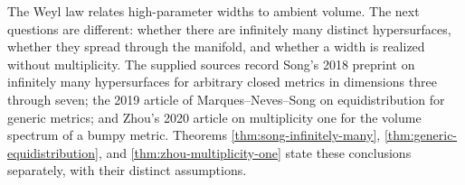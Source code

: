 \begin{remark}\label{hist:volume-spectrum}
The Weyl law \cite{LMN} relates high-parameter widths to ambient volume. The next questions are different: whether there are infinitely many distinct hypersurfaces, whether they spread through the manifold, and whether a width is realized without multiplicity. The supplied sources record Song's 2018 preprint \cite{Song18} on infinitely many hypersurfaces for arbitrary closed metrics in dimensions three through seven; the 2019 article of Marques--Neves--Song \cite{MNS19} on equidistribution for generic metrics; and Zhou's 2020 article \cite{Zhou20} on multiplicity one for the volume spectrum of a bumpy metric. Theorems \ref{thm:song-infinitely-many}, \ref{thm:generic-equidistribution}, and \ref{thm:zhou-multiplicity-one} state these conclusions separately, with their distinct assumptions.
\end{remark}
